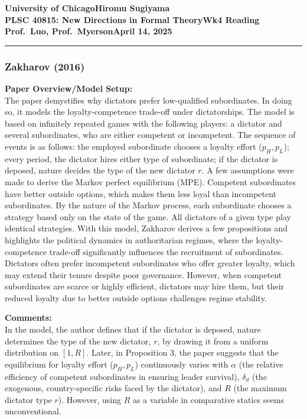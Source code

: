 \documentclass[11pt]{article}    %
\newcommand{\myname}{Hiromu Sugiyama}
\newcommand{\assignment}{Wk4 Reading}
\newcommand{\duedate}{April 14, 2025}
\begin{document}
\textbf{University of Chicago}\hfill\textbf{\myname}\\[0.01in]
\textbf{PLSC 40815: New Directions in Formal Theory}\hfill\textbf{\assignment}\\[0.01in]
\textbf{Prof.\ Luo, Prof.\ Myerson}\hfill\textbf{\duedate}\\
\smallskip\hrule\bigskip

\onehalfspacingspacing                    %
\subsubsection*{Zakharov (2016)}
\textbf{Paper Overview/Model Setup:} \\
The paper demystifies why dictators prefer low-qualified subordinates. In doing so, it models the loyalty-competence trade-off under dictatorships. The model is based on infinitely repeated games with the following players: a dictator and several subordinates, who are either competent or incompetent. The sequence of events is as follows: the employed subordinate chooses a loyalty effort ($p_H, p_L$); every period, the dictator hires either type of subordinate; if the dictator is deposed, nature decides the type of the new dictator $r$. A few assumptions were made to derive the Markov perfect equilibrium (MPE). Competent subordinates have better outside options, which makes them less loyal than incompetent subordinates. By the nature of the Markov process, each subordinate chooses a strategy based only on the state of the game. All dictators of a given type play identical strategies. With this model, Zakharov derives a few propositions and highlights the political dynamics in authoritarian regimes, where the loyalty-competence trade-off significantly influences the recruitment of subordinates. Dictators often prefer incompetent subordinates who offer greater loyalty, which may extend their tenure despite poor governance. However, when competent subordinates are scarce or highly efficient, dictators may hire them, but their reduced loyalty due to better outside options challenges regime stability.

\textbf{Comments:} \\
In the model, the author defines that if the dictator is deposed, nature determines the type of the new dictator, $r$, by drawing it from a uniform distribution on $[1, R]$. Later, in Proposition 3, the paper suggests that the equilibrium for loyalty effort ($p_H, p_L$) continuously varies with $\alpha$ (the relative efficiency of competent subordinates in ensuring leader survival), $\delta_d$ (the exogenous, country-specific risks faced by the dictator), and $R$ (the maximum dictator type $r$). However, using $R$ as a variable in comparative statics seems unconventional.
\end{document}
